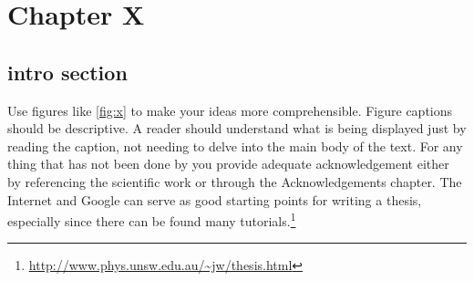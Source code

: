 \graphicspath{{img/}}









\chapter{Chapter X}
\label{chap:x}


\section{intro section}
Use figures like \ref{fig:x} to make your ideas more comprehensible. Figure captions should be descriptive. A reader should understand what is being displayed just by reading the caption, not needing to delve into the main body of the text. For any thing that has not been done by you provide adequate acknowledgement either by referencing the scientific work \cite{adami:1998, bentley:2002, reynolds:1978, reynolds:1987, lebar_bajec:2005a, lebar_bajec:2005b, heppner:1990} or through the Acknowledgements chapter. The Internet and Google can serve as good starting points for writing a thesis, especially since there can be found many tutorials.\footnote{\href{http://www.phys.unsw.edu.au/~jw/thesis.html}{http://www.phys.unsw.edu.au/\textasciitilde jw/thesis.html}}

